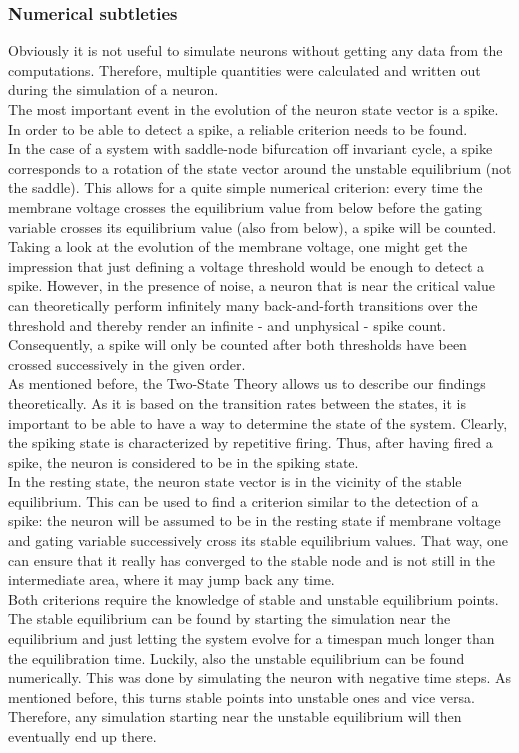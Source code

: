 \documentclass[12pt,a4paper]{article}
\begin{document}
\subsubsection{Numerical subtleties}
Obviously it is not useful to simulate neurons without getting any data from the computations. Therefore, multiple quantities were calculated and written out during the simulation of a neuron. \\
The most important event in the evolution of the neuron state vector is a spike. In order to be able to detect a spike, a reliable criterion needs to be found.\\
In the case of a system with saddle-node bifurcation off invariant cycle, a spike corresponds to a rotation of the state vector around the unstable equilibrium (not the saddle). This allows for a quite simple numerical criterion: every time the membrane voltage crosses the equilibrium value from below before the gating variable crosses its equilibrium value (also from below), a spike will be counted. Taking a look at the evolution of the membrane voltage, one might get the impression that just defining a voltage threshold would be enough to detect a spike. However, in the presence of noise, a neuron that is near the critical value can theoretically perform infinitely many back-and-forth transitions over the threshold and thereby render an infinite - and unphysical - spike count. Consequently, a spike will only be counted after both thresholds have been crossed successively in the given order.\\
As mentioned before, the Two-State Theory allows us to describe our findings theoretically. As it is based on the transition rates between the states, it is important to be able to have a way to determine the state of the system. Clearly, the spiking state is characterized by repetitive firing. Thus, after having fired a spike, the neuron is considered to be in the spiking state. \\
In the resting state, the neuron state vector is in the vicinity of the stable equilibrium. This can be used to find a criterion similar to the detection of a spike: the neuron will be assumed to be in the resting state if membrane voltage and gating variable successively cross its stable equilibrium values. That way, one can ensure that it really has converged to the stable node and is not still in the intermediate area, where it may jump back any time. \\
Both criterions require the knowledge of stable and unstable equilibrium points. The stable equilibrium can be found by starting the simulation near the equilibrium and just letting the system evolve for a timespan much longer than the equilibration time. Luckily, also the unstable equilibrium can be found numerically. This was done by simulating the neuron with negative time steps. As mentioned before, this turns stable points into unstable ones and vice versa. Therefore, any simulation starting near the unstable equilibrium will then eventually end up there.
\end{document}
